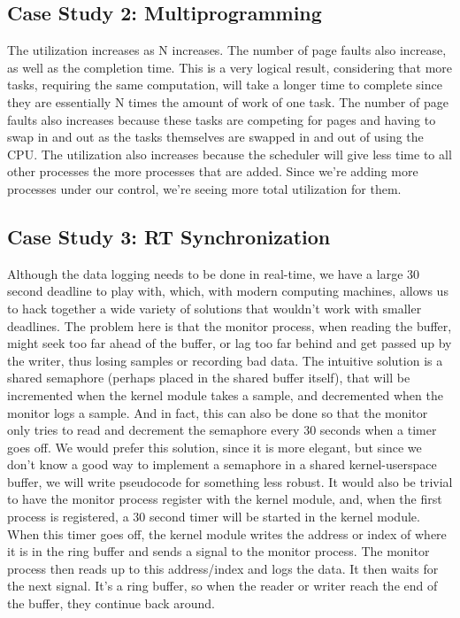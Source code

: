 \documentclass{article}
\begin{document}
\subsection{Case Study 2: Multiprogramming}
The utilization increases as N increases. The number of page faults also increase, as well as the completion time. This is a very logical result, considering that more tasks, requiring the same computation, will take a longer time to complete since they are essentially N times the amount of work of one task. The number of page faults also increases because these tasks are competing for pages and having to swap in and out as the tasks themselves are swapped in and out of using the CPU. The utilization also increases because the scheduler will give less time to all other processes the more processes that are added. Since we're adding more processes under our control, we're seeing more total utilization for them.

\subsection{Case Study 3: RT Synchronization}
Although the data logging needs to be done in real-time, we have a large 30 second deadline to play with, which, with modern computing machines, allows us to hack together a wide variety of solutions that wouldn't work with smaller deadlines. The problem here is that the monitor process, when reading the buffer, might seek too far ahead of the buffer, or lag too far behind and get passed up by the writer, thus losing samples or recording bad data. The intuitive solution is a shared semaphore (perhaps placed in the shared buffer itself), that will be incremented when the kernel module takes a sample, and decremented when the monitor logs a sample. And in fact, this can also be done so that the monitor only tries to read and decrement the semaphore every 30 seconds when a timer goes off. We would prefer this solution, since it is more elegant, but since we don't know a good way to implement a semaphore in a shared kernel-userspace buffer, we will write pseudocode for something less robust. It would also be trivial to have the monitor process register with the kernel module, and, when the first process is registered, a 30 second timer will be started in the kernel module. When this timer goes off, the kernel module writes the address or index of where it is in the ring buffer and sends a signal to the monitor process. The monitor process then reads up to this address/index and logs the data. It then waits for the next signal. It's a ring buffer, so when the reader or writer reach the end of the buffer, they continue back around. \\
\end{document}
